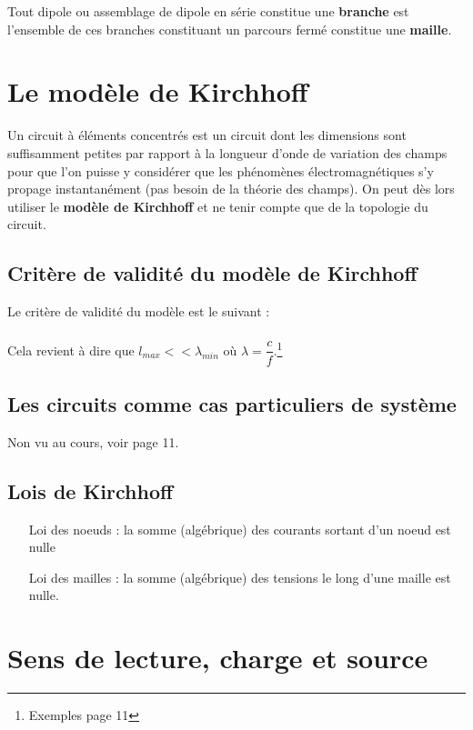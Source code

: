 \documentclass[british,french,11pt, a4paper, openany]{book}
\begin{document}
		Tout dipole ou assemblage de dipole en série constitue une \textbf{branche} est l'ensemble de ces branches constituant un parcours fermé constitue une \textbf{maille}.
		
		\section{Le modèle de Kirchhoff}
		Un circuit à éléments concentrés est un circuit dont les dimensions sont suffisamment petites par rapport à la longueur d'onde de variation des champs pour que l'on puisse y considérer que les phénomènes électromagnétiques s'y propage instantanément (pas besoin de la théorie des champs). On peut dès lors utiliser le \textbf{modèle de Kirchhoff} et ne tenir compte que de la topologie du circuit.
		
		\subsection{Critère de validité du modèle de Kirchhoff}
		Le critère de validité du modèle est le suivant :\\
		
		\ \\
		Cela revient à dire que $l_{max} << \lambda_{min}$ où $\lambda = \dfrac{c}{f}$.\footnote{Exemples page 11}
		
		\subsection{Les circuits comme cas particuliers de système}
		Non vu au cours, voir page 11.
		
		\subsection{Lois de Kirchhoff}
		\begin{itemize}
			\item[Loi des noeuds] : la somme (algébrique) des courants sortant d'un noeud est nulle
			\item[Loi des mailles] : la somme (algébrique) des tensions le long d'une maille est nulle.
		\end{itemize}
		
		\section{Sens de lecture, charge et source}
\end{document}
